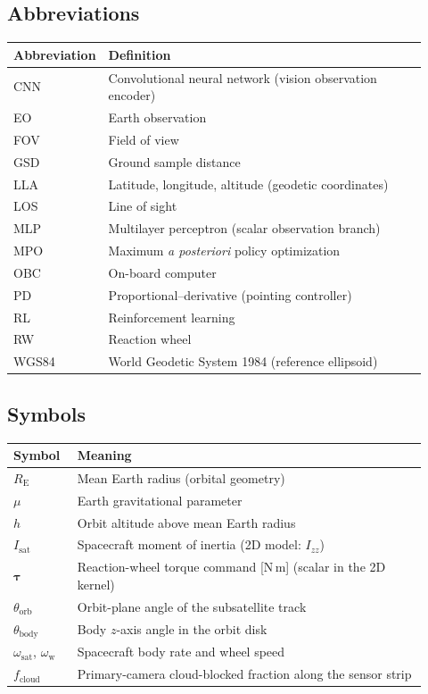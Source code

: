 
\subsection{Abbreviations}
\begin{tabular}{@{}p{0.12\linewidth}p{0.80\linewidth}@{}}
  \toprule
  Abbreviation & Definition \\
  \midrule
  CNN & Convolutional neural network (vision observation encoder) \\
  EO & Earth observation \\
  FOV & Field of view \\
  GSD & Ground sample distance \\
  LLA & Latitude, longitude, altitude (geodetic coordinates) \\
  LOS & Line of sight \\
  MLP & Multilayer perceptron (scalar observation branch) \\
  MPO & Maximum \emph{a posteriori} policy optimization \\
  OBC & On-board computer \\
  PD & Proportional--derivative (pointing controller) \\
  RL & Reinforcement learning \\
  RW & Reaction wheel \\
  WGS84 & World Geodetic System 1984 (reference ellipsoid) \\
  \bottomrule
\end{tabular}

\subsection{Symbols}
\begin{tabular}{@{}p{0.14\linewidth}p{0.78\linewidth}@{}}
  \toprule
  Symbol & Meaning \\
  \midrule
  $R_{\mathrm{E}}$ & Mean Earth radius (orbital geometry) \\
  $\mu$ & Earth gravitational parameter \\
  $h$ & Orbit altitude above mean Earth radius \\
  $I_{\mathrm{sat}}$ & Spacecraft moment of inertia (2D model: $I_{zz}$) \\
  $\boldsymbol{\tau}$ & Reaction-wheel torque command [N\,m] (scalar in the 2D kernel) \\
  $\theta_{\mathrm{orb}}$ & Orbit-plane angle of the subsatellite track \\
  $\theta_{\mathrm{body}}$ & Body $z$-axis angle in the orbit disk \\
  $\omega_{\mathrm{sat}}$, $\omega_{\mathrm{w}}$ & Spacecraft body rate and wheel speed \\
  $f_{\mathrm{cloud}}$ & Primary-camera cloud-blocked fraction along the sensor strip \\
  \bottomrule
\end{tabular}

